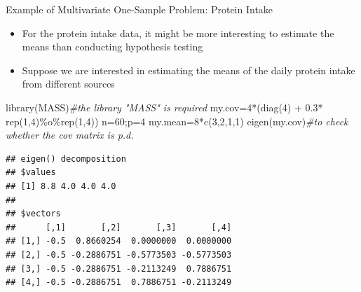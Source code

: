 \documentclass[
  ignorenonframetext,
]{beamer}
\newenvironment{Shaded}{\begin{snugshade}}{\end{snugshade}}
\newcommand{\CommentTok}[1]{\textcolor[rgb]{0.56,0.35,0.01}{\textit{#1}}}
\newcommand{\DecValTok}[1]{\textcolor[rgb]{0.00,0.00,0.81}{#1}}
\newcommand{\FloatTok}[1]{\textcolor[rgb]{0.00,0.00,0.81}{#1}}
\newcommand{\FunctionTok}[1]{\textcolor[rgb]{0.00,0.00,0.00}{#1}}
\newcommand{\NormalTok}[1]{#1}
\newcommand{\OtherTok}[1]{\textcolor[rgb]{0.56,0.35,0.01}{#1}}
\newcommand{\SpecialCharTok}[1]{\textcolor[rgb]{0.00,0.00,0.00}{#1}}
\providecommand{\tightlist}{%
  \setlength{\itemsep}{0pt}\setlength{\parskip}{0pt}}
\begin{document}
\begin{frame}[fragile]{Example of Multivariate One-Sample Problem:
Protein Intake}
\protect\hypertarget{example-of-multivariate-one-sample-problem-protein-intake}{}
\begin{itemize}
\tightlist
\item
  For the protein intake data, it might be more interesting to estimate
  the means than conducting hypothesis testing
\item
  Suppose we are interested in estimating the means of the daily protein
  intake from different sources
\end{itemize}

\tiny

\begin{Shaded}
\begin{Highlighting}[]
\FunctionTok{library}\NormalTok{(MASS)}\CommentTok{\#the library "MASS" is required}
\NormalTok{my.cov}\OtherTok{=}\DecValTok{4}\SpecialCharTok{*}\NormalTok{(}\FunctionTok{diag}\NormalTok{(}\DecValTok{4}\NormalTok{) }\SpecialCharTok{+} \FloatTok{0.3}\SpecialCharTok{*} \FunctionTok{rep}\NormalTok{(}\DecValTok{1}\NormalTok{,}\DecValTok{4}\NormalTok{)}\SpecialCharTok{\%o\%}\FunctionTok{rep}\NormalTok{(}\DecValTok{1}\NormalTok{,}\DecValTok{4}\NormalTok{))}
\NormalTok{n}\OtherTok{=}\DecValTok{60}\NormalTok{;p}\OtherTok{=}\DecValTok{4}
\NormalTok{my.mean}\OtherTok{=}\DecValTok{8}\SpecialCharTok{*}\FunctionTok{c}\NormalTok{(}\DecValTok{3}\NormalTok{,}\DecValTok{2}\NormalTok{,}\DecValTok{1}\NormalTok{,}\DecValTok{1}\NormalTok{)}
\FunctionTok{eigen}\NormalTok{(my.cov)}\CommentTok{\#to check whether the cov matrix is p.d.}
\end{Highlighting}
\end{Shaded}

\begin{verbatim}
## eigen() decomposition
## $values
## [1] 8.8 4.0 4.0 4.0
## 
## $vectors
##      [,1]       [,2]       [,3]       [,4]
## [1,] -0.5  0.8660254  0.0000000  0.0000000
## [2,] -0.5 -0.2886751 -0.5773503 -0.5773503
## [3,] -0.5 -0.2886751 -0.2113249  0.7886751
## [4,] -0.5 -0.2886751  0.7886751 -0.2113249
\end{verbatim}

\normalsize
\end{frame}
\end{document}
